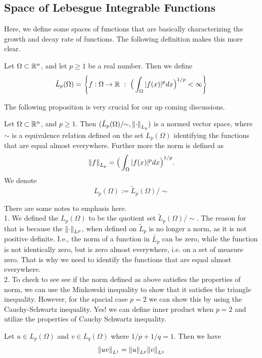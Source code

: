 \subsection{Space of Lebesgue Integrable Functions}
Here, we define some spaces of functions that are basically characterizing the growth and decay rate of functions. The following definition makes this more clear. 
\begin{definition}
	Let $ \Omega \subset \mathbb{R}^n $, and let $ p\geq 1 $ be a real number. Then we define
	\[ \tilde{L}_p(\Omega) = \Set{f:\Omega\to\R\ :\ \big(\int_\Omega \abs{f(x)}^p dx \big)^{1/p} < \infty} \]
\end{definition}

The following proposition is very crucial for our up coming discussions.
\begin{proposition}
	Let $ \Omega \subset \mathbb{R}^n $, and $ p\geq 1 $. Then $ (\tilde{L}_p(\Omega)/\!\!\sim, \norm{\cdot}_{L_p}) $ is a normed vector space, where $ \sim $ is a equivalence relation defined on the set $ L_p(\Omega) $ identifying the functions that are equal almost everywhere. Further more the norm is defined as
	\[ \norm{f}_{L_p} = \big(\int_\Omega |f(x)|^p dx\big)^{1/p}.\]
	We denote 
	\[  L_p(\Omega) :=  \tilde{L}_p(\Omega)/\!\!\sim \]
\end{proposition}
\begin{remark}
	There are some notes to emphasis here. \\
	1. We defined the $ L_p(\Omega) $ to be the quotient set $ \tilde{L}_p(\Omega)/\!\!\sim  $. The reason for that is because the $ \norm{\cdot}_{L^p} $, when defined on $\tilde{L}_p$ is no longer a norm, as it is not positive definite. I.e., the norm of a function in $ \tilde{L_p} $ can be zero, while the function is not identically zero, but is zero almost everywhere, i.e. on a set of measure zero. That is why we need to identify the functions that are equal almost everywhere. \\
	2. To check to see see if the norm defined as above satisfies the properties of norm, we can use the Minkowski inequality to show that it satisfies the triangle inequality. However, for the spacial case $ p=2 $ we can show this by using the Cauchy-Schwartz inequality. Yes! we can define inner product when $ p=2 $ and utilize the properties of Cauchy Schwartz inequality.
\end{remark}

\begin{proposition}
	Let $ u\in L_p(\Omega) $ and $ v \in L_q(\Omega) $ where $ 1/p + 1/q = 1. $
	Then we have
	\[ \norm{uv}_{L^1} = \norm{u}_{L^p} \norm{v}_{L^q} \]
\end{proposition}

